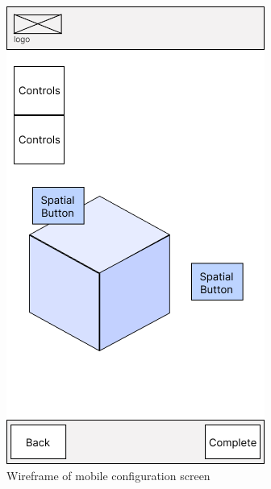 \begin{figure}[h]
    \centering
    \begin{minipage}{0.4\textwidth}
        \centering
        \includegraphics[width=\linewidth]{images/wireframe_configuration_mobile_default.png}
        \caption{Wireframe of mobile configuration screen}
        \label{fig:wireframe-configuration-mobile}
    \end{minipage}\hfill
    \begin{minipage}{0.4\textwidth}

\end{minipage}
\end{figure}
